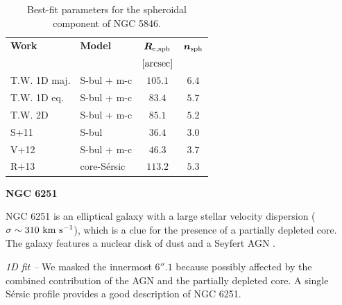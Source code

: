 \documentclass[preprint2]{emulateapj}
\begin{document}
  \begin{table}[h]
  \small
  \caption{Best-fit parameters for the spheroidal component of NGC 5846.}
  \begin{center}
  \begin{tabular}{llcc}
  \hline
  {\bf Work} & {\bf Model}   & $\bm R_{\rm e,sph}$    & $\bm n_{\rm sph}$ \\
    &  &  $[\rm arcsec]$ & \\
  \hline
  T.W. 1D maj. & S-bul + m-c & $105.1$  &  $6.4$ \\
  T.W. 1D eq.  & S-bul + m-c & $83.4$	&  $5.7$ \\
  T.W. 2D      & S-bul + m-c & $85.1$	&  $5.2$ \\
  \hline
  S+11      & S-bul	    & $36.4$   &  $3.0$ \\
  V+12      & S-bul + m-c   & $46.3$   &  $3.7$ \\
  R+13      & core-S\'ersic & $113.2$  &  $5.3$ \\
  \hline
  \end{tabular}
  \end{center}
  \label{tab:n5846}
  \end{table}

  \clearpage\newpage\noindent
  {\bf NGC 6251 \\}

  NGC 6251 is an elliptical galaxy with a large stellar velocity dispersion ($\sigma \sim 310~\rm km~s^{-1}$),
  which is a clue for the presence of a partially depleted core.
  The galaxy features a nuclear disk of dust \citep{ferrareseford1999n6251} and a Seyfert AGN \citep{panessabassani2002}.


  \emph{1D fit -- }
  We masked the innermost $6''.1$ because possibly affected by the combined contribution of the AGN 
  and the partially depleted core. 
  A single S\'ersic profile provides a good description of NGC 6251.
\end{document}
